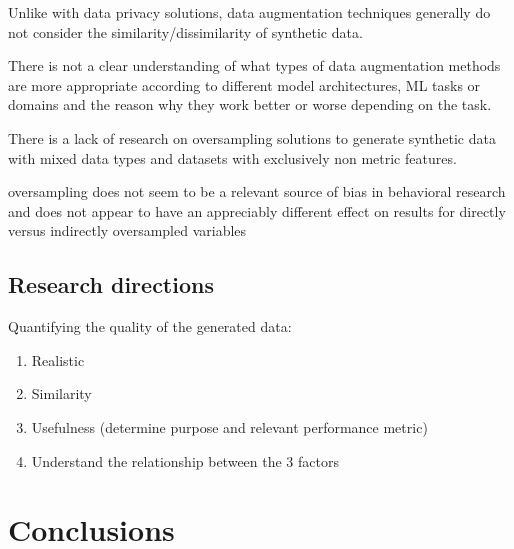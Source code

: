\documentclass[parskip=full]{scrartcl}
\begin{document}
Unlike with data privacy solutions, data augmentation techniques generally do
not consider the similarity/dissimilarity of synthetic data.

There is not a clear understanding of what types of data augmentation methods
are more appropriate according to different model architectures, ML tasks or
domains and the reason why they work better or worse depending on the task. 

There is a lack of research on oversampling solutions to generate synthetic
data with mixed data types and datasets with exclusively non metric features.






oversampling does not seem to be a relevant source of bias in behavioral
research and does not appear to have an appreciably different effect on
results for directly versus indirectly oversampled
variables~\cite{hauner2014latent}


\subsection{Research directions}


Quantifying the quality of the generated data:

\begin{enumerate}
    \item Realistic
    \item Similarity
    \item Usefulness (determine purpose and relevant performance metric)
    \item Understand the relationship between the 3 factors
\end{enumerate}

\section{Conclusions}

\printbibliography
\end{document}
